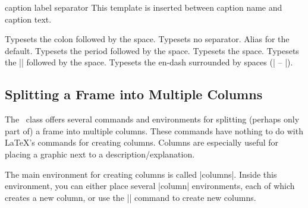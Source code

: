 \begin{element}{caption label separator}\yes\no\no
  This template is inserted between caption name and caption text.
  \begin{templateoptions}
    Typesets the colon followed by the space.
    Typesets no separator.
    Alias for the default.
    Typesets the period followed by the space.
    Typesets the space.
    Typesets the |\quad| followed by the space.
    Typesets the en-dash surrounded by spaces (| -- |).
  \end{templateoptions}
\end{element}


\subsection{Splitting a Frame into Multiple Columns}

The \beamer\ class offers several commands and environments for splitting (perhaps only part of) a frame into multiple columns. These commands have nothing to do with \LaTeX's commands for creating columns. Columns are especially useful for placing a graphic next to a description/explanation.

The main environment for creating columns is called |columns|. Inside this environment, you can either place several |column| environments, each of which creates a new column, or use the |\column| command to create new columns.

